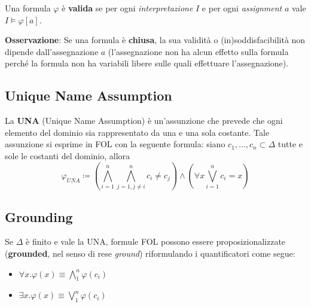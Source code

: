 Una formula $\varphi$ è \textbf{valida} se per ogni \textit{interpretazione} $I$ e per ogni \textit{assignment} $a$ vale $I \models \varphi[a]$.

\textbf{Osservazione}: Se una formula è \textbf{chiusa}, la sua validità o (in)soddisfacibilità non dipende dall'assegnazione $a$ (l'assegnazione non ha alcun effetto sulla formula perché la formula non ha variabili libere sulle quali effettuare l'assegnazione).

\subsection{Unique Name Assumption}

La \textbf{UNA} (Unique Name Assumption) è un'assunzione che prevede che ogni elemento del dominio sia rappresentato da una e una sola costante. Tale assunzione si esprime in FOL con la seguente formula: siano ${c_1, ..., c_n} \subset \Delta$ tutte e sole le costanti del dominio, allora
$$ \varphi_{UNA} \coloneqq (\bigwedge\limits_{i=1}^n \bigwedge\limits_{j=1,j\neq i}^n c_i \neq c_j) \land (\forall x \bigvee\limits_{i = 1}^n c_i = x)$$

\subsection{Grounding}

Se $\Delta$ è finito e vale la UNA, formule FOL possono essere proposizionalizzate (\textbf{grounded}, nel senso di rese \textit{ground}) riformulando i quantificatori come segue:
\begin{itemize}
\item $\forall x . \varphi(x) \equiv \bigwedge\limits_1^n  \varphi(c_i) $
\item $\exists x . \varphi(x) \equiv \bigvee\limits_1^n  \varphi(c_i) $
\end{itemize}
